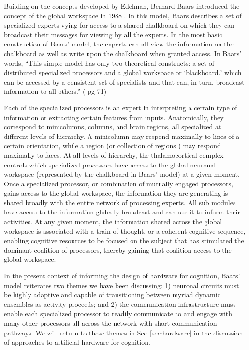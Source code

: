 Building on the concepts developed by Edelman, Bernard Baars introduced the concept of the global workspace in 1988 \cite{ba1988}. In this model, Baars describes a set of specialized experts vying for access to a shared chalkboard on which they can broadcast their messages for viewing by all the experts. In the most basic construction of Baars' model, the experts can all view the information on the chalkboard as well as write upon the chalkboard when granted access. In Baars' words, ``This simple model has only two theoretical constructs: a set of distributed specialized processors and a global workspace or `blackboard,' which can be accessed by a consistent set of specialists and that can, in turn, broadcast information to all others.'' (\cite{ba1988} pg 71) 

Each of the specialized processors is an expert in interpreting a certain type of information or extracting certain features from inputs. Anatomically, they correspond to minicolumns, columns, and brain regions, all specialized at different levels of hierarchy. A minicolumn may respond maximally to lines of a certain orientation, while a region (or collection of regions \cite{paper about the complex networks identifying faces}) may respond maximally to faces. At all levels of hierarchy, the thalamocortical complex controls which specialized processors have access to the global neuronal workspace (represented by the chalkboard in Baars' model) at a given moment. Once a specialized processor, or combination of mutually engaged processors, gains access to the global workspace, the information they are generating is shared broadly with the entire network of processing experts. All sub modules have access to the information globally broadcast and can use it to inform their activities. At any given moment, the information shared across the global workspace is associated with a train of thought, or a coherent cognitive sequence, enabling cognitive resources to be focused on the subject that has stimulated the dominant coalition of processors, thereby gaining that coalition access to the global workspace.

In the present context of informing the design of hardware for cognition, Baars' model reiterates two themes we have been discussing: 1) neuronal circuits must be highly adaptive and capable of transitioning between myriad dynamic ensembles as activity proceeds; and 2) the communication infrastructure must enable each specialized processor to readily communicate to and engage with many other processors all across the network with short communication pathways. We will return to these themes in Sec.\,\ref{sec:hardware} in the discussion of approaches to artificial hardware for cognition.


